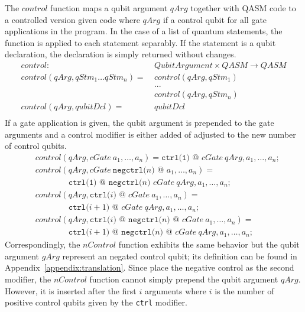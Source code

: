 The $control$ function maps a qubit argument $qArg$ together with QASM code to a controlled version given code where $qArg$ if a control qubit for all gate applications in the program. In the case of a list of quantum statements, the function is applied to each statement separably. If the statement is a qubit declaration, the declaration is simply returned without changes.
\begin{align*}
    control : \ & QubitArgument \times QASM \to QASM\\
    control(qArg, qStm_1 \dots qStm_n) = \ & control(qArg, qStm_1)\\
        & ...\\
        & control(qArg, qStm_n)\\
    control(qArg, qubitDcl) = \ & qubitDcl\\
\end{align*}
If a gate application is given, the qubit argument is prepended to the gate arguments and a control modifier is either added of adjusted to the new number of control qubits.
\begin{align*}
    &control(qArg, cGate \ a_1, \dots, a_n ) =  \texttt{ctrl(1) @ } cGate \ qArg, a_1, \dots, a_n\texttt{;}\\
    &control(qArg, cGate \ \texttt{negctrl(}n\texttt{) @ } a_1, \dots, a_n ) = \\
    & \quad \quad \quad \quad \texttt{ctrl(1) @ } \texttt{negctrl(}n\texttt{) }cGate \ qArg, a_1, \dots, a_n\texttt{;}\\
    &control(qArg, \texttt{ctrl(}i \texttt{) @ } cGate \ a_1, \dots, a_n ) = \\
    & \quad \quad \quad \quad \texttt{ctrl(}i+1 \texttt{) @ } cGate \ qArg, a_1, \dots, a_n\texttt{;}\\
    &control(qArg, \texttt{ctrl(}i \texttt{) @ } \texttt{negctrl(}n\texttt{) @ } cGate \ a_1, \dots, a_n ) = \\
    & \quad \quad \quad \quad \texttt{ctrl(}i+1 \texttt{) @ } \texttt{negctrl(}n\texttt{) @ } cGate \ qArg, a_1, \dots, a_n\texttt{;}
\end{align*}
Correspondingly, the $nControl$ function exhibits the same behavior but the qubit argument $gArg$ represent an negated control qubit; its definition can be found in Appendix~\ref{appendix:translation}. Since place the negative control as the second modifier, the $nControl$ function cannot simply prepend the qubit argument $qArg$. However, it is inserted after the first $i$ arguments where $i$ is the number of positive control qubits given by the \texttt{ctrl} modifier.